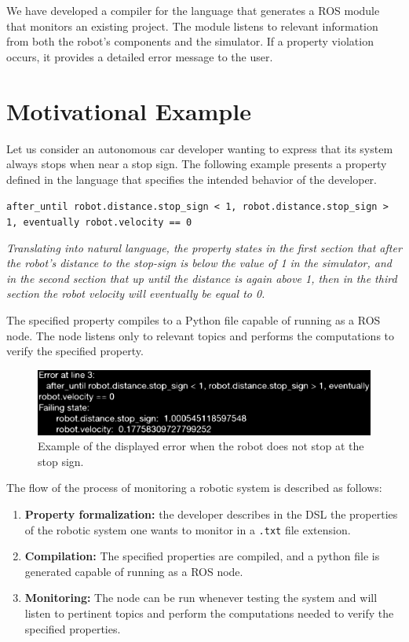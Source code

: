 \documentclass[runningheads]{llncs}
\begin{document}
We have developed a compiler for the language that generates a ROS module that monitors an existing project. The module listens to relevant information from both the robot's components and the simulator. If a property violation occurs, it provides a detailed error message to the user.


\section{Motivational Example}

Let us consider an autonomous car developer wanting to express that its system always stops when near a stop sign. The following example presents a property defined in the language that specifies the intended behavior of the developer.


\vspace{2mm}
\texttt{after\_until robot.distance.stop\_sign < 1, robot.distance.stop\_sign > 1, eventually robot.velocity == 0}
\vspace{2mm}

\textit{Translating into natural language, the property states in the first section that after the robot's distance to the stop-sign is below the value of 1 in the simulator, and in the second section that up until the distance is again above 1, then in the third section the robot velocity will eventually be equal to 0.}
\vspace{2mm}

The specified property compiles to a Python file capable of running as a ROS node. The node listens only to relevant topics and performs the computations to verify the specified property.

\begin{figure}
\includegraphics[width=\textwidth]{error.eps}
\caption{Example of the displayed error when the robot does not stop at the stop sign.} \label{fig1}
\end{figure}

The flow of the process of monitoring a robotic system is described as follows:

\begin{enumerate}[label=(\roman*)]
    \item \textbf{Property formalization:} the developer describes in the DSL the properties of the robotic system one wants to monitor in a \texttt{.txt} file extension.
    \item \textbf{Compilation:} The specified properties are compiled, and a python file is generated capable of running as a ROS node.
    \item \textbf{Monitoring:} The node can be run whenever testing the system and will listen to pertinent topics and perform the computations needed to verify the specified properties.
\end{enumerate}
\end{document}
